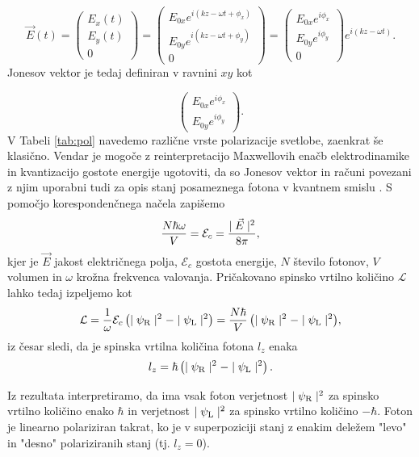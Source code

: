 \documentclass[12pt]{article}
\begin{document}
\begin{equation}
{\displaystyle \vec{E}(t) = {\begin{pmatrix}E_{x}(t)\\E_{y}(t)\\0\end{pmatrix}}={\begin{pmatrix}E_{0x}e^{i(kz-\omega t+\phi _{x})}\\E_{0y}e^{i(kz-\omega t+\phi _{y})}\\0\end{pmatrix}}={\begin{pmatrix}E_{0x}e^{i\phi _{x}}\\E_{0y}e^{i\phi _{y}}\\0\end{pmatrix}}e^{i(kz-\omega t)}.}
\end{equation}  
Jonesov vektor je tedaj definiran v ravnini $xy$ kot

\begin{equation}
{\displaystyle {\begin{pmatrix}E_{0x}e^{i\phi _{x}}\\E_{0y}e^{i\phi _{y}}\end{pmatrix}}.}
\end{equation} 
V Tabeli \ref{tab:pol} navedemo različne vrste polarizacije svetlobe, zaenkrat še klasično. Vendar je mogoče z reinterpretacijo Maxwellovih enačb elektrodinamike in kvantizacijo gostote energije ugotoviti, da so Jonesov vektor in računi povezani z njim  uporabni tudi za opis stanj posameznega fotona v kvantnem smislu \cite{PhotonPolarization2022}. S pomočjo korespondenčnega načela zapišemo
\begin{equation}
    {N \hbar \omega \over V} = \mathcal{E}_c = \frac{\mid \vec{E} \mid^2}{8\pi}, \end{equation}
kjer je $\vec{E}$ jakost električnega polja, $\mathcal{E}_c$ gostota energije, $N$ število fotonov, $V$ volumen in $\omega$ krožna frekvenca valovanja. Pričakovano spinsko vrtilno količino $\mathcal {L}$ lahko tedaj izpeljemo kot
\begin{equation}
{\displaystyle {\mathcal {L}}={1 \over \omega }{\mathcal {E}}_{c}\left(\mid \psi _{\rm {R}}\mid ^{2}-\mid \psi _{\rm {L}}\mid ^{2}\right)={N\hbar  \over V}\left(\mid \psi _{\rm {R}}\mid ^{2}-\mid \psi _{\rm {L}}\mid ^{2}\right)},
\end{equation}
iz česar sledi, da je spinska vrtilna količina fotona $l_{z}$ enaka 
\begin{equation}
{\displaystyle l_{z}=\hbar \left(\mid \psi _{\rm {R}}\mid ^{2}-\mid \psi _{\rm {L}}\mid ^{2}\right).}
\end{equation}
\par Iz rezultata interpretiramo, da ima vsak foton verjetnost $\mid \psi _{\rm {R}}\mid ^{2}$ za spinsko vrtilno količino enako $\hbar$ in verjetnost $\mid \psi _{\rm {L}}\mid ^{2}$ za spinsko vrtilno količino $- \hbar$. Foton je linearno polariziran takrat, ko je v superpoziciji stanj z enakim deležem "levo" in "desno" polariziranih stanj (tj. $ l_z = 0$). \cite{PhotonPolarization2022}
\end{document}
